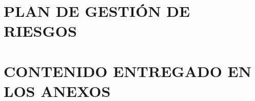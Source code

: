 \label{plan_de_gestion_de_riesgos}
\section*{PLAN DE GESTIÓN DE RIESGOS}


\newpage
\section*{CONTENIDO ENTREGADO EN LOS ANEXOS} 
